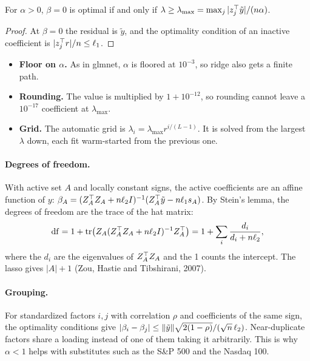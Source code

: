 \begin{proposition}[$\lambda_{\max}$]
For $\alpha>0$, $\beta=0$ is optimal if and only if
$\lambda\ge\lambda_{\max}=\max_j|z_j^\top\tilde y|/(n\alpha)$.
\end{proposition}
\begin{proof}
At $\beta=0$ the residual is $\tilde y$, and the optimality condition of an inactive
coefficient is $|z_j^\top r|/n\le\ell_1$.
\end{proof}
\begin{itemize}
  \item \textbf{Floor on $\alpha$.} As in glmnet, $\alpha$ is floored at $10^{-3}$, so ridge
        also gets a finite path.
  \item \textbf{Rounding.} The value is multiplied by $1+10^{-12}$, so rounding cannot
        leave a $10^{-17}$ coefficient at $\lambda_{\max}$.
  \item \textbf{Grid.} The automatic grid is $\lambda_i=\lambda_{\max}r^{i/(L-1)}$. It is
        solved from the largest $\lambda$ down, each fit warm-started from the previous
        one.
\end{itemize}

\paragraph{Degrees of freedom.} With active set $A$ and locally constant signs, the active
coefficients are an affine function of $y$:
$\beta_A=(Z_A^\top Z_A+n\ell_2I)^{-1}(Z_A^\top\tilde y-n\ell_1s_A)$. By Stein's lemma, the degrees of
freedom are the trace of the hat matrix:
\[
  \mathrm{df}=1+\operatorname{tr}\!\big(Z_A(Z_A^\top Z_A+n\ell_2I)^{-1}Z_A^\top\big)=1+\sum_i\frac{d_i}{d_i+n\ell_2},
\]
where the $d_i$ are the eigenvalues of $Z_A^\top Z_A$ and the 1 counts the intercept. The
lasso gives $|A|+1$ (Zou, Hastie and Tibshirani, 2007).

\paragraph{Grouping.} For standardized factors $i,j$ with correlation $\rho$ and coefficients
of the same sign, the optimality conditions give
$|\beta_i-\beta_j|\le\lVert \tilde y\rVert\sqrt{2(1-\rho)}/(\sqrt n\,\ell_2)$. Near-duplicate factors
share a loading instead of one of them taking it arbitrarily. This is why $\alpha<1$ helps
with substitutes such as the S\&P 500 and the Nasdaq 100.
\begin{codepointers}
\end{codepointers}

